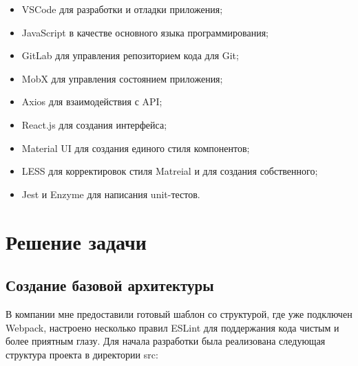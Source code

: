 \documentclass[a4paper,12pt]{diplom}
\begin{document}
\begin{itemize}
\item VSCode для разработки и отладки приложения;
\item JavaScript в качестве основного языка программирования;
\item GitLab для управления репозиторием кода для Git;
\item MobX для управления состоянием приложения;
\item Axios для взаимодействия с API;
\item React.js для создания интерфейса;
\item Material UI для создания единого стиля компонентов;
\item LESS для корректировок стиля Matreial и для создания собственного;
\item Jest и Enzyme для написания unit-тестов.
\end{itemize}

\chapter{Решение задачи}

\section{Создание базовой архитектуры}
В компании мне предоставили готовый шаблон со структурой, где уже подключен Webpack, настроено несколько правил ESLint для поддержания кода чистым и более приятным глазу.
Для начала разработки была реализована следующая структура проекта в директории src:

\medskip

\renewcommand*\DTstyle{\ttfamily\textcolor{black}}
\end{document}

